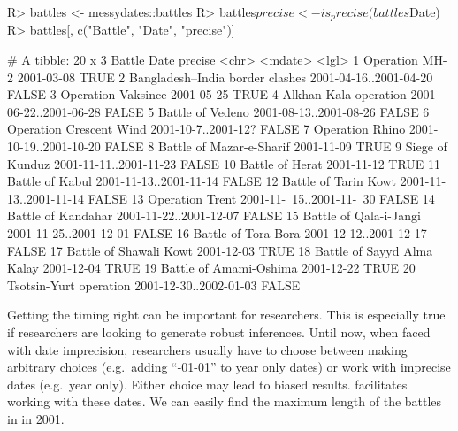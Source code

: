 \documentclass[
]{jss}
\begin{document}
\begin{CodeChunk}
\begin{CodeInput}
R> battles <- messydates::battles
R> battles$precise <- is_precise(battles$Date)
R> battles[, c("Battle", "Date", "precise")]
\end{CodeInput}
\begin{CodeOutput}
# A tibble: 20 x 3
   Battle                          Date                     precise
   <chr>                           <mdate>                  <lgl>  
 1 Operation MH-2                  2001-03-08               TRUE   
 2 Bangladesh–India border clashes 2001-04-16..2001-04-20   FALSE  
 3 Operation Vaksince              2001-05-25               TRUE   
 4 Alkhan-Kala operation           2001-06-22..2001-06-28   FALSE  
 5 Battle of Vedeno                2001-08-13..2001-08-26   FALSE  
 6 Operation Crescent Wind         2001-10-7..2001-12?      FALSE  
 7 Operation Rhino                 2001-10-19..2001-10-20   FALSE  
 8 Battle of Mazar-e-Sharif        2001-11-09               TRUE   
 9 Siege of Kunduz                 2001-11-11..2001-11-23   FALSE  
10 Battle of Herat                 2001-11-12               TRUE   
11 Battle of Kabul                 2001-11-13..2001-11-14   FALSE  
12 Battle of Tarin Kowt            2001-11-13..2001-11-14   FALSE  
13 Operation Trent                 2001-11-~15..2001-11-~30 FALSE  
14 Battle of Kandahar              2001-11-22..2001-12-07   FALSE  
15 Battle of Qala-i-Jangi          2001-11-25..2001-12-01   FALSE  
16 Battle of Tora Bora             2001-12-12..2001-12-17   FALSE  
17 Battle of Shawali Kowt          2001-12-03               TRUE   
18 Battle of Sayyd Alma Kalay      2001-12-04               TRUE   
19 Battle of Amami-Oshima          2001-12-22               TRUE   
20 Tsotsin-Yurt operation          2001-12-30..2002-01-03   FALSE  
\end{CodeOutput}
\end{CodeChunk}

Getting the timing right can be important for researchers. This is
especially true if researchers are looking to generate robust
inferences. Until now, when faced with date imprecision, researchers
usually have to choose between making arbitrary choices (e.g.~adding
``-01-01'' to year only dates) or work with imprecise dates (e.g.~year
only). Either choice may lead to biased results. 
facilitates working with these dates. We can easily find the maximum
length of the battles in in 2001.
\end{document}
